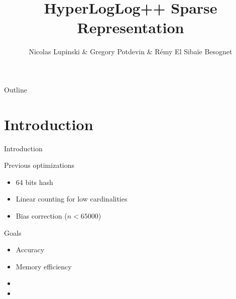 \documentclass{beamer}
\title{HyperLogLog++ Sparse Representation}
\author{Nicolas Lupinski \& Gregory Potdevin \& Rémy El Sibaïe Besognet}
\begin{document}
\begin{frame}
  \titlepage  
\end{frame}

\begin{frame}{Outline}
  \tableofcontents
\end{frame}


\section{Introduction}
\begin{frame}{Introduction}

  \begin{block}{Previous optimizations}
    \begin{itemize}
      \item 64 bits hash
      \item Linear counting for low cardinalities
      \item Bias correction ($n < 65000$)
    \end{itemize}
  \end{block}


  \begin{block}{Goals}
    \begin{itemize}
      \item Accuracy
      \item Memory efficiency
      \item {} 
      \item {} 
    \end{itemize}
  \end{block}

\end{frame}

\end{document}
